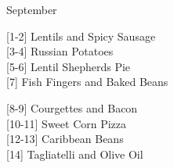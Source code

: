 		\begin{menu}{September}
    
    \begin{recipelist}
    
        {\scriptsize[1-2]} Lentils and Spicy Sausage\\
        {\scriptsize[3-4]} Russian Potatoes\\
        {\scriptsize[5-6]} Lentil Shepherds Pie\\
        {\scriptsize[7]} Fish Fingers and Baked Beans\\%
    \end{recipelist}%
    \begin{recipelist}
    
        {\scriptsize[8-9]} Courgettes and Bacon\\
        {\scriptsize[10-11]} Sweet Corn Pizza\\
        {\scriptsize[12-13]} Caribbean Beans\\
        {\scriptsize[14]} Tagliatelli and Olive Oil\\%
    \end{recipelist}\par%
  

\end{menu}
